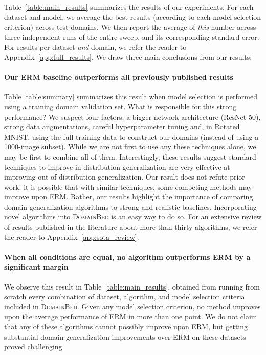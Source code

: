 \documentclass{article}
\newcommand{\domainbed}{\textsc{DomainBed}\xspace}
\begin{document}
Table~\ref{table:main_results} summarizes the results of our experiments.
For each dataset and model, we average the best results (according to each model selection criterion) across test domains. We then report the average of \textit{this} number across three independent runs of the entire sweep, and its corresponding standard error.
For results per dataset \emph{and} domain, we refer the reader to Appendix~\ref{app:full_results}.
We draw three main conclusions from our results:

\paragraph{Our ERM baseline outperforms all previously published results}
Table \ref{table:summary} summarizes this result when model selection is performed using a training domain validation set.
What is responsible for this strong performance?
We suspect four factors: a bigger network architecture (ResNet-50), strong data augmentations, careful hyperparameter tuning and, in Rotated MNIST, using the full training data to construct our domains (instead of using a 1000-image subset).
While we are not first to use any these techniques alone, we may be first to combine all of them.
Interestingly, these results suggest standard techniques to improve in-distribution generalization are very effective at improving out-of-distribution generalization.
Our result does not refute prior work: it is possible that with similar techniques, some competing methods may improve upon ERM.
Rather, our results highlight the importance of comparing domain generalization algorithms to strong and realistic baselines.
Incorporating novel algorithms into \domainbed is an easy way to do so.
For an extensive review of results published in the literature about more than thirty algorithms, we refer the reader to Appendix~\ref{app:sota_review}.

\paragraph{When all conditions are equal, no algorithm outperforms ERM by a significant margin}
We observe this result in Table~\ref{table:main_results}, obtained from running from scratch every combination of dataset, algorithm, and model selection criteria included in \domainbed.
Given any model selection criterion, no method improves upon the average performance of ERM in more than one point.
We do not claim that any of these algorithms cannot possibly improve upon ERM, but getting substantial domain generalization improvements over ERM on these datasets proved challenging. 
\end{document}
